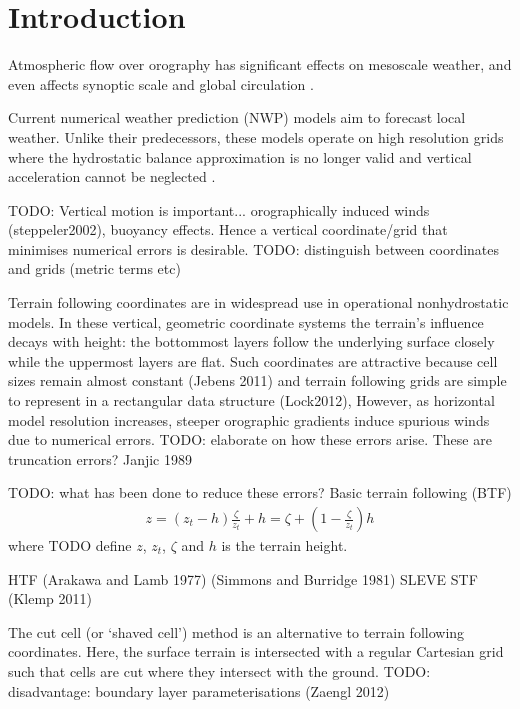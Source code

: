 \chapter{Introduction}


Atmospheric flow over orography has significant effects on mesoscale weather, and even affects synoptic scale and global circulation \autocite{good2013}.

Current numerical weather prediction (NWP) models aim to forecast local weather.  Unlike their predecessors, these models operate on high resolution grids where the hydrostatic balance approximation is no longer valid and vertical acceleration cannot be neglected \autocite{steppeler2002}.

TODO: Vertical motion is important... orographically induced winds (steppeler2002), buoyancy effects.  Hence a vertical coordinate/grid that minimises numerical errors is desirable. TODO: distinguish between coordinates and grids (metric terms etc)

Terrain following coordinates are in widespread use in operational nonhydrostatic models.  In these vertical, geometric coordinate systems the terrain's influence decays with height: the bottommost layers follow the underlying surface closely while the uppermost layers are flat.  Such coordinates are attractive because cell sizes remain almost constant (Jebens 2011) and terrain following grids are simple to represent in a rectangular data structure (Lock2012),  However, as horizontal model resolution increases, steeper orographic gradients induce spurious winds due to numerical errors. \autocite{TODO}  TODO: elaborate on how these errors arise.  These are truncation errors?  Janjic 1989

TODO: what has been done to reduce these errors?
Basic terrain following (BTF) \autocite{galchen1975} 
\begin{align}
z = \left( z_t - h \right) \frac{\zeta}{z_t} + h = \zeta + \left( 1 - \frac{\zeta}{z_t} \right) h
\end{align}
where TODO define $z$, $z_t$, $\zeta$ and $h$ is the terrain height.

HTF (Arakawa and Lamb 1977) (Simmons and Burridge 1981)
SLEVE
STF (Klemp 2011)

The cut cell (or `shaved cell')  method is an alternative to terrain following coordinates.  Here, the surface terrain is intersected with a regular Cartesian grid such that cells are cut where they intersect with the ground.  TODO: disadvantage: boundary layer parameterisations (Zaengl 2012)
